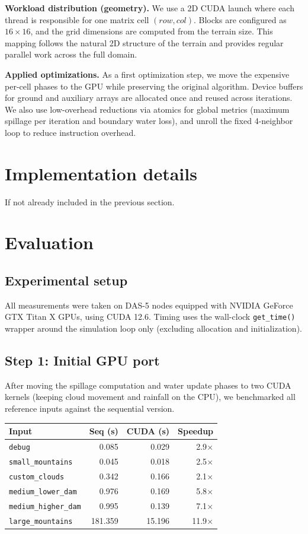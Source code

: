 \documentclass[sigconf, nonacm, review]{acmart}
\begin{document}
\textbf{Workload distribution (geometry).}
We use a 2D CUDA launch where each thread is responsible for one matrix cell $(row,col)$. Blocks are configured as $16\times16$, and the grid dimensions are computed from the terrain size. This mapping follows the natural 2D structure of the terrain and provides regular parallel work across the full domain.

\textbf{Applied optimizations.}
As a first optimization step, we move the expensive per-cell phases to the GPU while preserving the original algorithm. Device buffers for ground and auxiliary arrays are allocated once and reused across iterations. We also use low-overhead reductions via atomics for global metrics (maximum spillage per iteration and boundary water loss), and unroll the fixed 4-neighbor loop to reduce instruction overhead.

\section{Implementation details}
If not already included in the previous section.

\section{Evaluation}

\subsection{Experimental setup}
All measurements were taken on DAS-5 nodes equipped with NVIDIA GeForce GTX Titan X GPUs, using CUDA 12.6. Timing uses the wall-clock \texttt{get\_time()} wrapper around the simulation loop only (excluding allocation and initialization).

\subsection{Step 1: Initial GPU port}
After moving the spillage computation and water update phases to two CUDA kernels (keeping cloud movement and rainfall on the CPU), we benchmarked all reference inputs against the sequential version.

\begin{center}
\begin{tabular}{lrrr}
\hline
\textbf{Input} & \textbf{Seq (s)} & \textbf{CUDA (s)} & \textbf{Speedup} \\
\hline
\texttt{debug}             &   0.085 &   0.029 &  2.9$\times$ \\
\texttt{small\_mountains}  &   0.045 &   0.018 &  2.5$\times$ \\
\texttt{custom\_clouds}    &   0.342 &   0.166 &  2.1$\times$ \\
\texttt{medium\_lower\_dam}&   0.976 &   0.169 &  5.8$\times$ \\
\texttt{medium\_higher\_dam}&  0.995 &   0.139 &  7.1$\times$ \\
\texttt{large\_mountains}  & 181.359 &  15.196 & 11.9$\times$ \\
\hline
\end{tabular}
\end{center}
\end{document}
